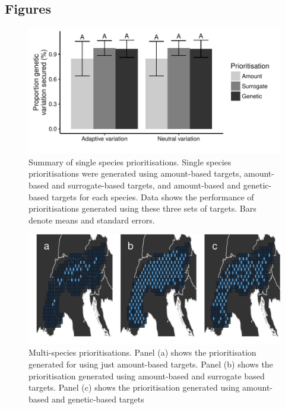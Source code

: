 \documentclass[11pt,]{article}
\title{}
\author{}
\date{}
\begin{document}
\maketitle


\subsection{Figures}\label{figures}

\begin{figure}[htbp]
\centering
\includegraphics{figures_files/figure-latex/unnamed-chunk-2-1.pdf}
\caption{Summary of single species prioritisations. Single species
prioritisations were generated using amount-based targets, amount-based
and surrogate-based targets, and amount-based and genetic-based targets
for each species. Data shows the performance of prioritisations
generated using these three sets of targets. Bars denote means and
standard errors.}
\end{figure}

\begin{figure}[htbp]
\centering
\includegraphics{figures_files/figure-latex/unnamed-chunk-3-1.pdf}
\caption{Multi-species prioritisations. Panel (a) shows the
prioritisation generated for using just amount-based targets. Panel (b)
shows the prioritisation generated using amount-based and surrogate
based targets. Panel (c) shows the prioritisation generated using
amount-based and genetic-based targets}
\end{figure}
\end{document}
